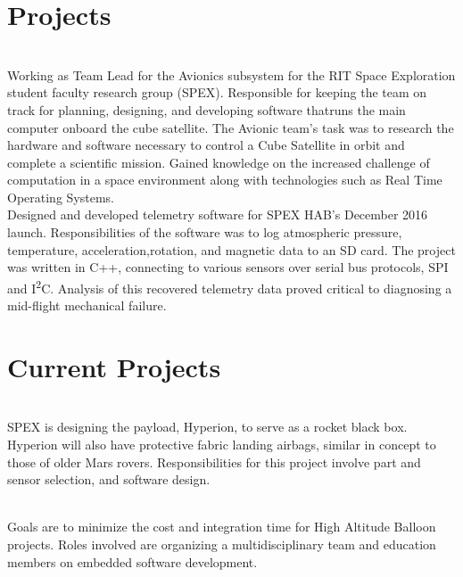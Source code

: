\documentclass[]{deedy-resume-openfont}
\begin{document}
\section{Projects}
\raggedright

\descript{}\hfill \location{}\\
Working as Team Lead for the Avionics subsystem for the RIT Space Exploration student faculty
research group (SPEX). Responsible for keeping the team on track for planning, designing, and developing
software thatruns the main computer onboard the cube satellite. The Avionic
team's task was to research the hardware and software necessary to control
a Cube Satellite in orbit and complete a scientific mission. Gained knowledge
on the increased challenge of computation in a space environment along with
technologies such as Real Time Operating Systems.
\bigbreak
{}
\descript{}\hfill \location{}\\
Designed and developed telemetry software for SPEX HAB’s December 2016 launch. Responsibilities of
the software was to log atmospheric pressure, temperature, acceleration,rotation, and magnetic data to an
SD card. The project was written in C++, connecting to various sensors over serial bus protocols, SPI and
I\textsuperscript{2}C. Analysis of this recovered telemetry data proved critical to diagnosing a mid-flight mechanical failure.
\sectionsep

\section{Current Projects}
\raggedright

\descript{}\hfill \location{}\\
SPEX is designing the payload, Hyperion, to serve as a rocket black box. Hyperion will also have protective
fabric landing airbags, similar in concept to those of older Mars rovers. Responsibilities for this project involve
part and sensor selection, and software design.

\bigbreak
{}
\descript{}\hfill \location{}\\
Goals are to minimize the cost and integration time for High Altitude Balloon projects.  Roles involved are organizing
a multidisciplinary team and education members on embedded software development.
\ 
\end{document}
